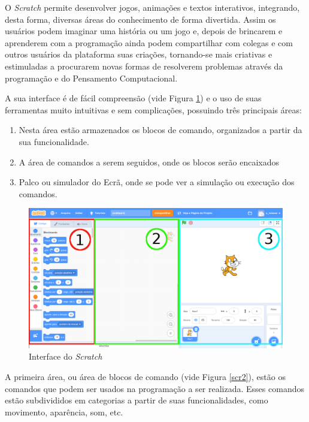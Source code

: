 \documentclass[12pt, openright, a4paper, brazil, english, french, spanish, bibjustif, openany, oneside]{abntex2}
\begin{document}
O \textit{Scratch} permite desenvolver jogos, animações e textos interativos, integrando, desta forma, diversas áreas do conhecimento de forma divertida. Assim os usuários podem imaginar uma história ou um jogo e, depois de brincarem e aprenderem com a programação ainda podem compartilhar com colegas e com outros usuários da plataforma suas criações, tornando-se mais criativas e estimuladas a procurarem novas formas de resolverem problemas através da programação e do Pensamento Computacional. 

 
A sua interface é de fácil compreensão (vide Figura \ref{scr1}) e o uso de suas ferramentas muito intuitivas e sem complicações, possuindo três principais áreas:
 
\begin{enumerate}
\item Nesta área estão armazenados os blocos de comando, organizados a partir da sua funcionalidade.
\item A área de comandos a serem seguidos, onde os blocos serão encaixados
\item Palco ou simulador do Ecrã, onde se pode ver a simulação ou execução dos comandos.
\end{enumerate}

\begin{figure}[H]

    \center
    \caption{Interface do \textit{Scratch} \label{scr1}}
    \includegraphics[width=13cm]{scratch1.png}
    
\end{figure}


A primeira área, ou área de blocos de comando (vide Figura \ref{scr2}), estão os comandos que podem ser usados na programação a ser realizada. Esses comandos estão subdivididos em categorias a partir de suas funcionalidades, como movimento, aparência, som, etc.
\end{document}
